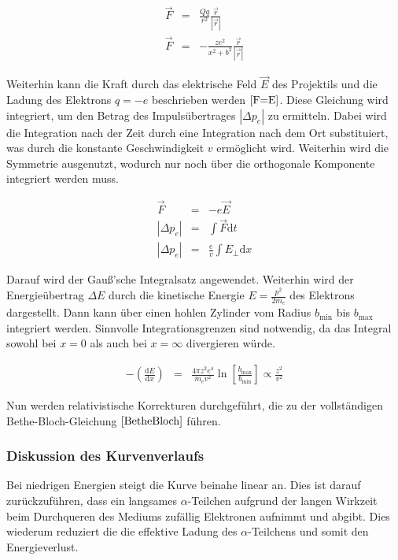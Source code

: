 \documentclass[12pt,a4paper]{scrartcl}
\numberwithin{equation}{section} %
\begin{document}
\begin{eqnarray}
    \vec F &=& \frac{Qq}{r^2} \frac{\vec{r}}{\left|\vec r\right|} \\
    \vec F &=& -\frac{ze^2}{x^2+b^2} \frac{\vec{r}}{\left|\vec r\right|}
\end{eqnarray}

Weiterhin kann die Kraft durch das elektrische Feld $\vec E$ des Projektils und die Ladung des Elektrons $q=-e$ beschrieben werden $\eqref{F=E}$. Diese Gleichung wird integriert, um den Betrag des Impulsübertrages $\left|\Delta p_e\right|$ zu ermitteln. Dabei wird die Integration nach der Zeit durch eine Integration nach dem Ort substituiert, was durch die konstante Geschwindigkeit $v$ ermöglicht wird. Weiterhin wird die Symmetrie ausgenutzt, wodurch nur noch über die orthogonale Komponente integriert werden muss.

\begin{eqnarray}
    \vec F &=& -e \vec E \label{F=E} \\
    \left|\Delta p_e\right| &=& \int \vec F \mathrm dt \\
    \left|\Delta p_e\right| &=& \frac{e}{v} \int E_\perp \mathrm dx
\end{eqnarray}

Darauf wird der Gauß'sche Integralsatz angewendet. Weiterhin wird der Energieübertrag $\Delta E$ durch die kinetische Energie $E=\frac{p^2}{2m_e}$ des Elektrons dargestellt. Dann kann über einen hohlen Zylinder vom Radius $b_\mathrm{min}$ bis $b_\mathrm{max}$ integriert werden. Sinnvolle Integrationsgrenzen sind notwendig, da das Integral sowohl bei $x=0$ als auch bei $x=\infty$ divergieren würde.

\begin{eqnarray}
    -\left(\frac{\mathrm dE}{\mathrm dx}\right)
        &=& \frac{4\pi z^2 e^4}{m_ev^2}
            \ln\left[\frac{b_\mathrm{max}}{b_\mathrm{min}}\right]
            \propto \frac{z^2}{v^2}
\end{eqnarray}

Nun werden relativistische Korrekturen durchgeführt, die zu der vollständigen Bethe-Bloch-Gleichung $\eqref{BetheBloch}$ führen.

\hypertarget{diskussion-des-kurvenverlaufs}{%
\subsubsection{Diskussion des
Kurvenverlaufs}\label{diskussion-des-kurvenverlaufs}}

Bei niedrigen Energien steigt die Kurve beinahe linear an. Dies ist darauf zurückzuführen, dass ein langsames $\alpha$-Teilchen aufgrund der langen Wirkzeit beim Durchqueren des Mediums zufällig Elektronen aufnimmt und abgibt. Dies wiederum reduziert die die effektive Ladung des $\alpha$-Teilchens und somit den Energieverlust.
\end{document}
